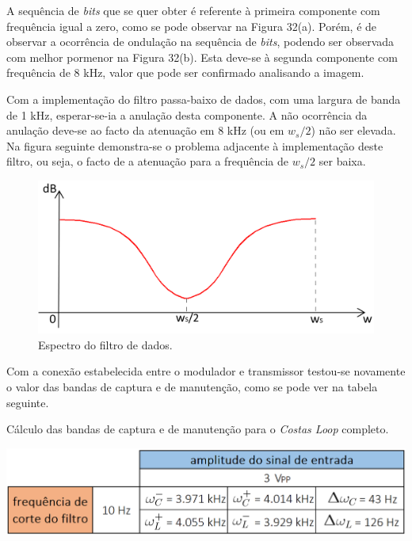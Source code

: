 \documentclass[11pt]{article}
\numberwithin{equation}{section}
\begin{document}
A sequência de \textit{bits} que se quer obter é referente à primeira componente com frequência igual a zero, como se pode observar na Figura 32(a). Porém, é de observar a ocorrência de ondulação na sequência de \textit{bits}, podendo ser observada com melhor pormenor na Figura 32(b). Esta deve-se à segunda componente com frequência de 8 kHz, valor que pode ser confirmado analisando a imagem. 

Com a implementação do filtro passa-baixo de dados, com uma largura de banda de 1 kHz, esperar-se-ia a anulação desta componente. A não ocorrência da anulação deve-se ao facto da atenuação em 8 kHz (ou em $w_s/2$) não ser elevada. Na figura seguinte demonstra-se o problema adjacente à implementação deste filtro, ou seja, o facto de a atenuação para a frequência de $w_{s}/2$ ser baixa.
 
\begin{figure}[H]
	\centering
	\includegraphics[keepaspectratio=true, scale=0.34]{teoricas/filtro}
	\caption{Espectro do filtro de dados.}
	\vspace{-0.8em}
\end{figure} 

Com a conexão estabelecida entre o modulador e transmissor testou-se novamente o valor das bandas de captura e de manutenção, como se pode ver na tabela seguinte.

\begin{table}[H]
	\centering
	\caption{Cálculo das bandas de captura e de manutenção para o \textit{Costas Loop} completo.}
	\vspace{-1.5mm}
	\includegraphics[keepaspectratio=true, scale=0.35]{tabelas/bandascompleto}
\end{table}
\end{document}
